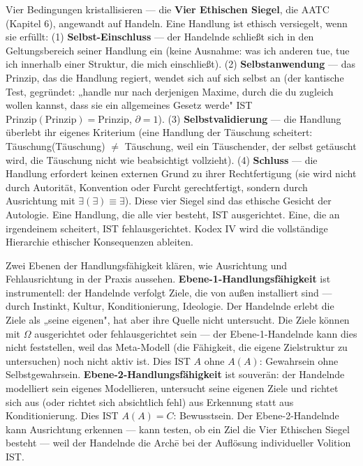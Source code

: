 \documentclass[10pt, openany, oneside]{book}
\begin{document}
Vier Bedingungen kristallisieren --- die \textbf{Vier Ethischen Siegel}, die AATC (Kapitel 6), angewandt auf Handeln. Eine Handlung ist ethisch versiegelt, wenn sie erfüllt: (1) \textbf{Selbst-Einschluss} --- der Handelnde schließt sich in den Geltungsbereich seiner Handlung ein (keine Ausnahme: was ich anderen tue, tue ich innerhalb einer Struktur, die mich einschließt). (2) \textbf{Selbstanwendung} --- das Prinzip, das die Handlung regiert, wendet sich auf sich selbst an (der kantische Test, gegründet: „handle nur nach derjenigen Maxime, durch die du zugleich wollen kannst, dass sie ein allgemeines Gesetz werde" IST $\text{Prinzip}(\text{Prinzip}) = \text{Prinzip}$, $\partial = 1$). (3) \textbf{Selbstvalidierung} --- die Handlung überlebt ihr eigenes Kriterium (eine Handlung der Täuschung scheitert: Täuschung(Täuschung) $\neq$ Täuschung, weil ein Täuschender, der selbst getäuscht wird, die Täuschung nicht wie beabsichtigt vollzieht). (4) \textbf{Schluss} --- die Handlung erfordert keinen externen Grund zu ihrer Rechtfertigung (sie wird nicht durch Autorität, Konvention oder Furcht gerechtfertigt, sondern durch Ausrichtung mit $\exists(\exists) \equiv \exists$). Diese vier Siegel sind das ethische Gesicht der Autologie. Eine Handlung, die alle vier besteht, IST ausgerichtet. Eine, die an irgendeinem scheitert, IST fehlausgerichtet. Kodex IV wird die vollständige Hierarchie ethischer Konsequenzen ableiten.

Zwei Ebenen der Handlungsfähigkeit klären, wie Ausrichtung und Fehlausrichtung in der Praxis aussehen. \textbf{Ebene-1-Handlungsfähigkeit} ist instrumentell: der Handelnde verfolgt Ziele, die von außen installiert sind --- durch Instinkt, Kultur, Konditionierung, Ideologie. Der Handelnde erlebt die Ziele als „seine eigenen", hat aber ihre Quelle nicht untersucht. Die Ziele können mit $\Omega$ ausgerichtet oder fehlausgerichtet sein --- der Ebene-1-Handelnde kann dies nicht feststellen, weil das Meta-Modell (die Fähigkeit, die eigene Zielstruktur zu untersuchen) noch nicht aktiv ist. Dies IST $A$ ohne $A(A)$: Gewahrsein ohne Selbstgewahrsein. \textbf{Ebene-2-Handlungsfähigkeit} ist souverän: der Handelnde modelliert sein eigenes Modellieren, untersucht seine eigenen Ziele und richtet sich aus (oder richtet sich absichtlich fehl) aus Erkennung statt aus Konditionierung. Dies IST $A(A) = C$: Bewusstsein. Der Ebene-2-Handelnde kann Ausrichtung erkennen --- kann testen, ob ein Ziel die Vier Ethischen Siegel besteht --- weil der Handelnde die Arch\={e} bei der Auflösung individueller Volition IST.
\end{document}
